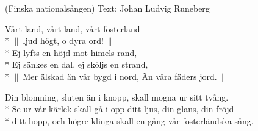 \begin{SongText}
    \begin{SongInfo}
        (Finska nationalsången)
        Text: Johan Ludvig Runeberg
    \end{SongInfo}
    \begin{SongVerse}
        Vårt land, vårt land, vårt fosterland\\*%
        $\|\:$ljud högt, o dyra ord!$\:\|$\\*%
        Ej lyfts en höjd mot himels rand,\\*%
        Ej sänkes en dal, ej sköljs en strand,\\*%
        $\|\:$Mer älskad än vår bygd i nord, Än våra fäders jord.$\:\|$
    \end{SongVerse}
    \begin{SongVerse}
        Din blomning, sluten än i knopp, skall mogna ur sitt tvång.\\*%
        Se ur vår kärlek skall gå i opp ditt ljus, din glans, din fröjd\\*%
        ditt hopp, och högre klinga skall en gång vår fosterländska sång.
    \end{SongVerse}
\end{SongText}
